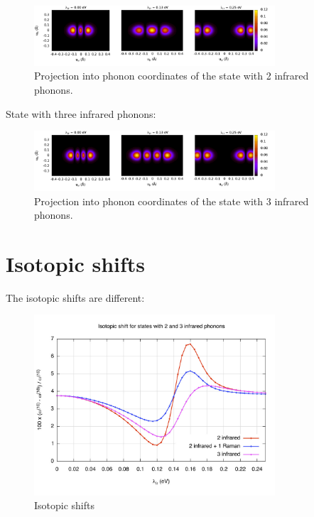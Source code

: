 \begin{figure}[ht!]
\centering
\includegraphics[width=0.8\textwidth]{images/ph-second_infrared.png}
\caption{Projection into phonon coordinates of the state with 2 infrared phonons.}
\label{fig:ph-second_infrared}
\end{figure}

State with three infrared phonons:

\begin{figure}[ht!]
\centering
\includegraphics[width=0.8\textwidth]{images/ph-third_infrared.png}
\caption{Projection into phonon coordinates of the state with 3 infrared phonons.}
\label{fig:ph-third_infrared}
\end{figure}

\section{Isotopic shifts}

The isotopic shifts are different:

\begin{figure}[ht!]
\centering
\includegraphics[width=0.8\textwidth]{images/isot-2_3ir.jpg}
\caption{Isotopic shifts}
\label{fig:isot-2_3ir}
\end{figure}
